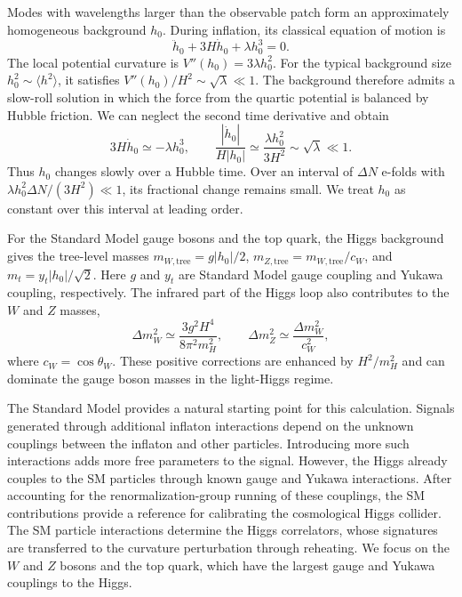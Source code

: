 \documentclass[a4paper,12pt]{article}
\begin{document}
Modes with wavelengths larger than the observable patch form an approximately homogeneous background $h_0$.
During inflation, its classical equation of motion is
\begin{equation}
    \ddot h_0+3H\dot h_0+\lambda h_0^3=0.
    \label{eq:overview-higgs-eom}
\end{equation}
The local potential curvature is $V''(h_0)=3\lambda h_0^2$.
For the typical background size $h_0^2\sim\langle h^2\rangle$, it satisfies $V''(h_0)/H^2\sim\sqrt\lambda\ll1$.
The background therefore admits a slow-roll solution in which the force from the quartic potential is balanced by Hubble friction.
We can neglect the second time derivative and obtain
\begin{equation}
    3H\dot h_0\simeq-\lambda h_0^3,\qquad
    \frac{|\dot h_0|}{H|h_0|}\simeq
    \frac{\lambda h_0^2}{3H^2}\sim\sqrt\lambda\ll1.
    \label{eq:overview-higgs-slow-roll}
\end{equation}
Thus $h_0$ changes slowly over a Hubble time.
Over an interval of $\Delta N$ e-folds with $\lambda h_0^2\Delta N/(3H^2)\ll1$, its fractional change remains small.
We treat $h_0$ as constant over this interval at leading order.

For the Standard Model gauge bosons and the top quark, the Higgs background gives the tree-level masses $m_{W,\mathrm{tree}}=g|h_0|/2$, $m_{Z,\mathrm{tree}}=m_{W,\mathrm{tree}}/c_W$, and $m_t=y_t|h_0|/\sqrt2$.
Here $g$ and $y_t$ are Standard Model gauge coupling and Yukawa coupling, respectively.
The infrared part of the Higgs loop also contributes to the $W$ and $Z$ masses,
\begin{equation}
    \Delta m_W^2\simeq\frac{3g^2H^4}{8\pi^2m_H^2},\qquad
    \Delta m_Z^2\simeq\frac{\Delta m_W^2}{c_W^2},
    \label{eq:overview-vector-mass-corrections}
\end{equation}
where $c_W=\cos\theta_W$.
These positive corrections are enhanced by $H^2/m_H^2$ and can dominate the gauge boson masses in the light-Higgs regime.

The Standard Model provides a natural starting point for this calculation.
Signals generated through additional inflaton interactions depend on the unknown couplings between the inflaton and other particles.
Introducing more such interactions adds more free parameters to the signal.
However, the Higgs already couples to the SM particles through known gauge and Yukawa interactions.
After accounting for the renormalization-group running of these couplings, the SM contributions provide a reference for calibrating the cosmological Higgs collider.
The SM particle interactions determine the Higgs correlators, whose signatures are transferred to the curvature perturbation through reheating.
We focus on the $W$ and $Z$ bosons and the top quark, which have the largest gauge and Yukawa couplings to the Higgs.
\end{document}
